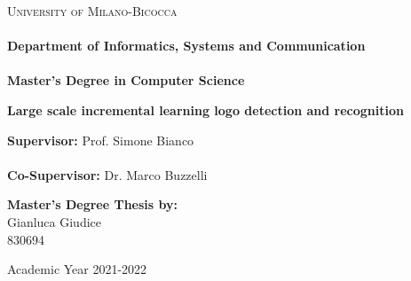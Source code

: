 \documentclass[corpo=11pt,english,numerazioneromana]{toptesi}
\begin{document}
\english



\begin{titlepage}
  \noindent
	\begin{minipage}[t]{0.21\textwidth}
	\end{minipage}
	\begin{minipage}[t]{0.79\textwidth}
	{
{\textsc{University of Milano-Bicocca}} \\\\
\textbf{Department of Informatics, Systems and Communication} \\\\
\textbf{Master's Degree in Computer Science} \\
	\par
	}
	\end{minipage}
	\vspace{25mm}
	
	\begin{center}{\Huge{\textbf{Large scale incremental learning logo detection and recognition}\par}}
	\end{center}        
	\vspace{25mm}
	\noindent
	{\large \textbf{Supervisor:} Prof. Simone Bianco} \\\\
	{\large \textbf{Co-Supervisor:} Dr. Marco Buzzelli} \\        
	\vspace{20mm}
	\begin{flushright}
		{\large \textbf{Master's Degree Thesis by:}} \\
		\vspace{2mm}
		\large{Gianluca Giudice} \\
		\vspace{2mm}
		\large{830694}
		
	\end{flushright}
	\vspace{25mm}
	\begin{center}
		{\large{Academic Year 2021-2022}}
	\end{center}
\end{titlepage}
	
\end{document}
